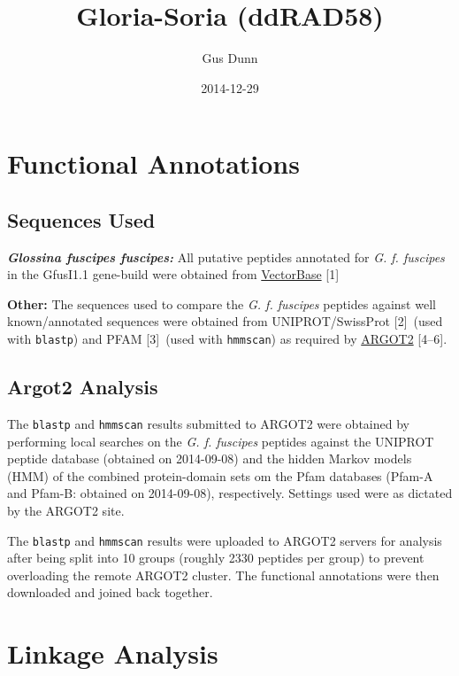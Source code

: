 \documentclass[letterpaper]{scrartcl}
\title{Gloria-Soria (ddRAD58)}
\author{Gus Dunn}
\date{2014-12-29}
\begin{document}
\maketitle

{
\hypersetup{linkcolor=black}
\setcounter{tocdepth}{3}
\tableofcontents
}
\section{Functional Annotations}\label{functional-annotations}

\subsection{Sequences Used}\label{sequences-used}

\textbf{\emph{Glossina fuscipes fuscipes:}} All putative peptides
annotated for \emph{G. f. fuscipes} in the GfusI1.1 gene-build were
obtained from \href{link_address}{VectorBase} {[}1{]}

\textbf{Other:} The sequences used to compare the \emph{G. f. fuscipes}
peptides against well known/annotated sequences were obtained from
UNIPROT/SwissProt {[}2{]}~(used with \texttt{blastp}) and PFAM
{[}3{]}~(used with \texttt{hmmscan}) as required by
\href{link_address}{ARGOT2} {[}4--6{]}.

\subsection{Argot2 Analysis}\label{argot2-analysis}

The \texttt{blastp} and \texttt{hmmscan} results submitted to ARGOT2
were obtained by performing local searches on the \emph{G. f. fuscipes}
peptides against the UNIPROT peptide database (obtained on 2014-09-08)
and the hidden Markov models (HMM) of the combined protein-domain sets
om the Pfam databases (Pfam-A and Pfam-B: obtained on 2014-09-08),
respectively. Settings used were as dictated by the ARGOT2 site.

The \texttt{blastp} and \texttt{hmmscan} results were uploaded to ARGOT2
servers for analysis after being split into 10 groups (roughly 2330
peptides per group) to prevent overloading the remote ARGOT2 cluster.
The functional annotations were then downloaded and joined back
together.

\section{Linkage Analysis}\label{linkage-analysis}
\end{document}
